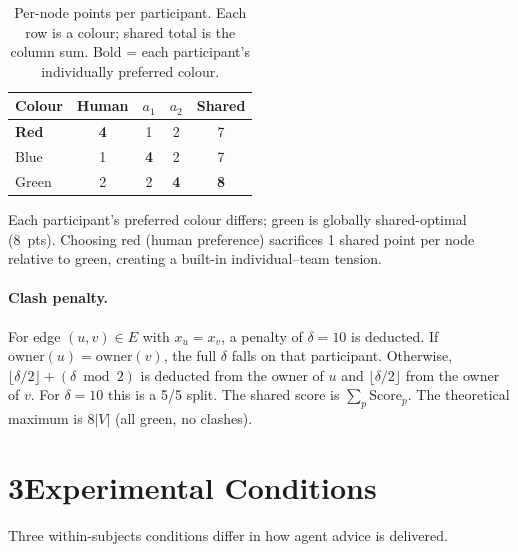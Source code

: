 \documentclass[9pt,twocolumn]{article}
\begin{document}
\begin{table}[h]
\centering
\caption{Per-node points per participant.  Each row is a colour; shared total is the
column sum.  Bold = each participant's individually preferred colour.}
\label{tab:pts}
\vspace{2pt}
\begin{tabular}{lcccc}
\toprule
\textbf{Colour} & \textbf{Human} & $a_1$ & $a_2$ & \textbf{Shared} \\
\midrule
\textbf{Red}   & \textbf{4} & 1 & 2 & 7 \\
Blue            & 1 & \textbf{4} & 2 & 7 \\
Green           & 2 & 2 & \textbf{4} & \textbf{8} \\
\bottomrule
\end{tabular}
\end{table}

Each participant's preferred colour differs; green is globally shared-optimal (8~pts).
Choosing red (human preference) sacrifices 1 shared point per node relative to green,
creating a built-in individual--team tension.

\paragraph{Clash penalty.}
For edge $(u,v)\in E$ with $x_u = x_v$, a penalty of $\delta=10$ is deducted.
If $\mathrm{owner}(u)=\mathrm{owner}(v)$, the full $\delta$ falls on that participant.
Otherwise, $\lfloor\delta/2\rfloor + (\delta \bmod 2)$ is deducted from the owner of $u$
and $\lfloor\delta/2\rfloor$ from the owner of $v$.  For $\delta=10$ this is a 5/5 split.
The shared score is $\sum_p \mathrm{Score}_p$.  The theoretical maximum is $8|V|$
(all green, no clashes).

\section*{3\quad Experimental Conditions}

Three within-subjects conditions differ in how agent advice is delivered.
\end{document}
